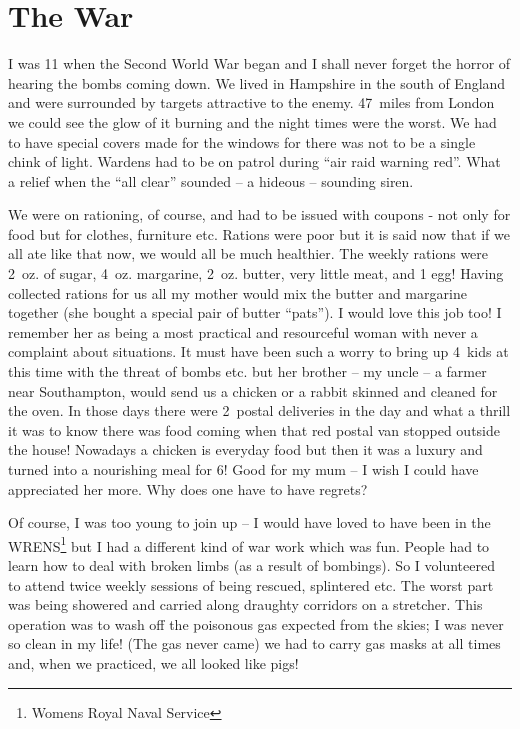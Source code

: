 \chapter{The War}

I was 11 when the Second World War began and I shall never forget the
horror of hearing the bombs coming down. We lived in Hampshire in the
south of England and were surrounded by targets attractive to the
enemy. 47~miles from London we could see the glow of it burning and
the night times were the worst. We had to have special covers made for
the windows for there was not to be a single chink of light. Wardens
had to be on patrol during ``air raid warning red''. What a relief
when the ``all clear'' sounded – a hideous – sounding siren.

We were on rationing, of course, and had to be issued with coupons -
not only for food but for clothes, furniture etc. Rations were poor
but it is said now that if we all ate like that now, we would all be
much healthier. The weekly rations were 2~oz. of sugar,
4~oz. margarine, 2~oz. butter, very little meat, and 1 egg! Having
collected rations for us all my mother would mix the butter and
margarine together (she bought a special pair of butter ``pats''). I
would love this job too! I remember her as being a most practical and
resourceful woman with never a complaint about situations. It must
have been such a worry to bring up 4~kids at this time with the threat
of bombs etc.  but her brother -- my uncle -- a farmer near
Southampton, would send us a chicken or a rabbit skinned and cleaned
for the oven. In those days there were 2~postal deliveries in the day
and what a thrill it was to know there was food coming when that red
postal van stopped outside the house! Nowadays a chicken is everyday
food but then it was a luxury and turned into a nourishing meal for 6!
Good for my mum -- I wish I could have appreciated her more. Why does
one have to have regrets?

Of course, I was too young to join up -- I would have loved to have
been in the WRENS\footnote{Womens Royal Naval Service} but I had a
different kind of war work which was fun. People had to learn how to
deal with broken limbs (as a result of bombings). So I volunteered to
attend twice weekly sessions of being rescued, splintered etc. The
worst part was being showered and carried along draughty corridors on
a stretcher. This operation was to wash off the poisonous gas expected
from the skies; I was never so clean in my life! (The gas never came)
we had to carry gas masks at all times and, when we practiced, we all
looked like pigs!

